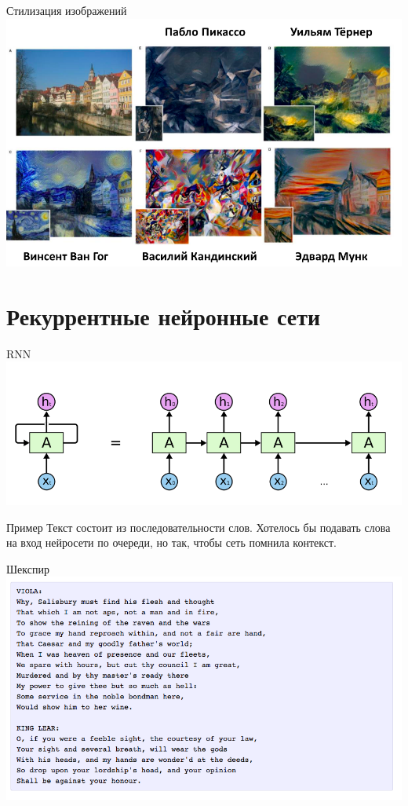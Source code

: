\documentclass[10pt]{beamer}
\begin{document}
{
\begin{frame}{Стилизация изображений}
  \centering
  \includegraphics[width=\textwidth, keepaspectratio = true]{images/style}   
\end{frame}
}

\section{Рекуррентные нейронные сети}

\begin{frame}{RNN}
  \centering
  \includegraphics[width=0.9 \textwidth, keepaspectratio = true]{images/RNN}   
\end{frame}

\begin{frame}{Пример}
  Текст состоит из последовательности слов. Хотелось бы подавать слова на вход нейросети по очереди, но так, чтобы сеть помнила контекст.
\end{frame}

{
\begin{frame}{Шекспир}
  \centering
  \includegraphics[width=0.9 \textwidth, keepaspectratio = true]{images/shakespeare}   
\end{frame}
}
\end{document}
